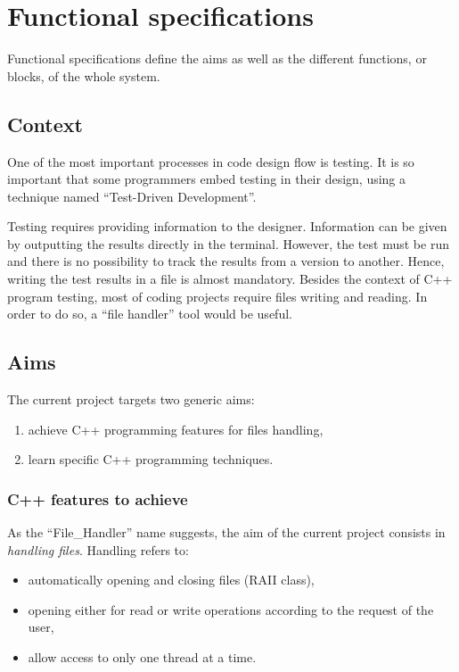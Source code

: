 \chapter{Functional specifications}

Functional specifications define the aims as well as the different functions, or blocks, of the whole system.


\section{Context}

	One of the most important processes in code design flow is testing.
	It is so important that some programmers embed testing in their design, using a technique named \enquote{Test-Driven Development}.
	
	Testing requires providing information to the designer.
	Information can be given by outputting the results directly in the terminal.
	However, the test must be run and there is no possibility to track the results from a version to another.
	Hence, writing the test results in a file is almost mandatory.
	Besides the context of C++ program testing, most of coding projects require files writing and reading.
	In order to do so, a \enquote{file handler} tool would be useful.
	


\section{Aims}

	The current project targets two generic aims:
	\begin{enumerate}
		\item achieve C++ programming features for files handling,
		\item learn specific C++ programming techniques.
	\end{enumerate}


	\subsection{C++ features to achieve}

	 	As the \enquote{File\_Handler} name suggests, the aim of the current project consists in \emph{handling files}.
	 	Handling refers to:
	 	\begin{itemize}
	 		\item automatically opening and closing files (RAII class),
	 		\item opening either for read or write operations according to the request of the user,
	 		\item allow access to only one thread at a time.
	 	\end{itemize}
 	
